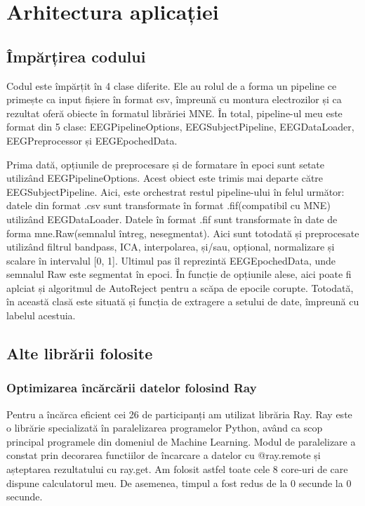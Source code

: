 \def\timpInainteDeRay{0}
\def\timpDupaRay{0}

\chapter{Arhitectura aplicației}
\section{Împărțirea codului}
Codul este împărțit în 4 clase diferite. Ele au rolul de a forma un pipeline ce primește ca input fișiere în format csv, împreună cu montura electrozilor și ca rezultat oferă obiecte în formatul librăriei MNE.
În total, pipeline-ul meu este format din 5 clase: EEGPipelineOptions, EEGSubjectPipeline, EEGDataLoader, EEGPreprocessor și EEGEpochedData. 

Prima dată, opțiunile de preprocesare și de formatare în epoci sunt setate utilizând EEGPipelineOptions. Acest obiect este trimis mai departe către EEGSubjectPipeline. Aici, este orchestrat restul pipeline-ului în felul următor: datele din format .csv sunt transformate în format .fif(compatibil cu MNE) utilizând EEGDataLoader. Datele în format .fif sunt transformate în date de forma mne.Raw(semnalul întreg, nesegmentat). Aici sunt totodată și preprocesate utilizând filtrul bandpass, ICA, interpolarea, și/sau, opțional, normalizare și scalare în intervalul [0, 1].  Ultimul pas îl reprezintă EEGEpochedData, unde semnalul Raw este segmentat în epoci. În funcție de opțiunile alese, aici poate fi aplciat și algoritmul de AutoReject pentru a scăpa de epocile corupte. Totodată, în această clasă este situată și funcția de extragere a setului de date, împreună cu labelul acestuia.


\section{Alte librării folosite}
\subsection{Optimizarea încărcării datelor folosind Ray}
Pentru a încărca eficient cei 26 de participanți am utilizat librăria Ray\cite{Ray}. Ray este o librărie specializată în paralelizarea programelor Python, având ca scop principal programele din domeniul de Machine Learning. Modul de paralelizare a constat prin decorarea functiilor de încarcare a datelor cu @ray.remote și așteptarea rezultatului cu ray.get. Am folosit astfel toate cele 8 core-uri de care dispune calculatorul meu. De asemenea, timpul a fost redus de la $\timpInainteDeRay$ secunde la $\timpDupaRay$ secunde.

